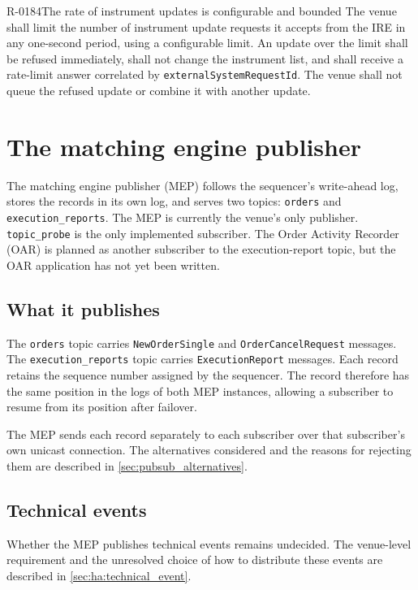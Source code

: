 \begin{requirement}{R-0184}{The rate of instrument updates is configurable and bounded}
  The venue shall limit the number of instrument update requests it accepts
  from the IRE in any one-second period, using a configurable limit. An update
  over the limit shall be refused immediately, shall not change the instrument
  list, and shall receive a rate-limit answer correlated by
  \texttt{externalSystemRequestId}. The venue shall not queue the refused
  update or combine it with another update.
\end{requirement}

\section{The matching engine publisher}
\label{sec:matching_engine_publisher}

The matching engine publisher (MEP) follows the sequencer's write-ahead log,
stores the records in its own log, and serves two topics: \texttt{orders} and
\texttt{execution\_reports}. The MEP is currently the venue's only publisher.
\texttt{topic\_probe} is the only implemented subscriber. The Order Activity
Recorder (OAR) is planned as another subscriber to the execution-report topic,
but the OAR application has not yet been written.

\subsection{What it publishes}
\label{sec:mep_pubsub}

The \texttt{orders} topic carries \texttt{NewOrderSingle} and
\texttt{OrderCancelRequest} messages. The \texttt{execution\_reports} topic
carries \texttt{ExecutionReport} messages. Each record retains the sequence
number assigned by the sequencer. The record therefore has the same position
in the logs of both MEP instances, allowing a subscriber to resume from its
position after failover.

The MEP sends each record separately to each subscriber over that subscriber's
own unicast connection. The alternatives considered and the reasons for
rejecting them are described in \cref{sec:pubsub_alternatives}.

\subsection{Technical events}
\label{sec:mep_technical_events}

Whether the MEP publishes technical events remains undecided. The venue-level
requirement and the unresolved choice of how to distribute these events are
described in \cref{sec:ha:technical_event}.
